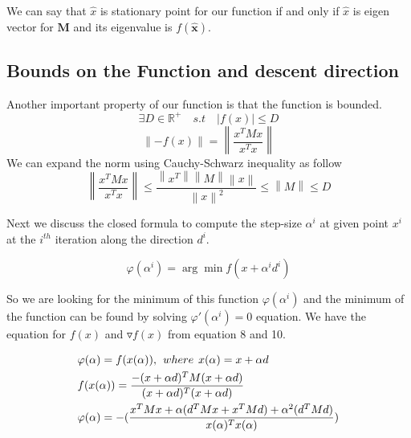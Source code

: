 \documentclass{article}
\numberwithin{equation}{section}
\begin{document}
We can say that $\hat{x}$ is stationary point for our function if and only if $\hat{x}$ is eigen vector for $\boldsymbol{M}$ and its eigenvalue is $f(\boldsymbol{\hat{\boldsymbol{x}}})$.

\subsection{Bounds on the Function and descent direction}

Another important property of our function is that the function is bounded.   
\begin{equation*}
    \exists D \in \mathbb{R^+} \quad s.t \quad |f(x)| \leq D
\end{equation*}
\begin{equation*}
   \left \| -f(x) \right \| = \left \| \frac{x^TMx}{x^Tx} \right \|
  \end{equation*}
 We can expand the norm using Cauchy-Schwarz inequality as follow
 \begin{equation}
  \left \| \frac{x^TMx}{x^Tx} \right \| \leq \frac{\left \| x^T \right \|\left \| M \right \|\left \| x \right \|}{\left \| x \right \|^2} \leq \left \| M \right \| \leq D
 \end{equation}

Next we discuss the closed formula to  compute the step-size $\alpha ^i$ at given point \textbf{$x^i$} at the $i^{th}$ iteration along the direction $d^i$. 

 \begin{equation*}
   \varphi(\alpha ^i) = \arg \min {f(x+\alpha ^i d ^i)}
\end{equation*}

So we are looking for the minimum of this function $\varphi(\alpha^i)$ and the minimum of the function can be found by solving $\varphi'(\alpha^i)=0$ equation.  We have the equation for $f(x)$ and $\triangledown f(x)$ from equation 8 and 10.

 \begin{equation*}
 \begin{aligned}
   &\varphi(\alpha) = f(x(\alpha)),\hspace{0.15cm} where \hspace{0.15cm} x(\alpha) = x+\alpha d  \\
   &f(x(\alpha)) = \frac{-(x+\alpha d)^TM(x+\alpha d)}{(x+\alpha d)^T(x+\alpha d)} \\
   &\varphi(\alpha) =  -(\frac{x^TMx + \alpha (d^TMx + x^TMd) + \alpha^2(d^TMd)}{x(\alpha)^Tx(\alpha)}) \\
   \end{aligned}
\end{equation*} 
\end{document}
